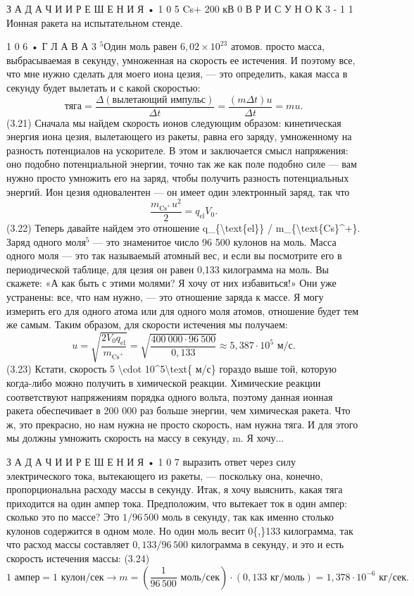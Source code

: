 \documentclass[10pt,oneside]{article}
\begin{document}
З А Д А Ч И  И  Р Е Ш Е Н И Я • 1 0 5 Cs+ 200 кВ 0 В Р И С У Н О К  3 - 1 1 Ионная ракета на испытательном стенде.\par

1 0 6 • Г Л А В А  3 \(^5\)Один моль равен \(6{,}02 \times 10^{23}\) атомов. просто масса, выбрасываемая в секунду, умноженная на скорость ее истечения. И поэтому все, что мне нужно сделать для моего иона цезия, --- это определить, какая масса в секунду будет вылетать и с какой скоростью: \[\text{тяга} = \frac{\Delta(\text{вылетающий импульс})}{\Delta t} = \frac{(m\Delta t) u}{\Delta t} = mu.\] (3.21) Сначала мы найдем скорость ионов следующим образом: кинетическая энергия иона цезия, вылетающего из ракеты, равна его заряду, умноженному на разность потенциалов на ускорителе. В этом и заключается смысл напряжения: оно подобно потенциальной энергии, точно так же как поле подобно силе --- вам нужно просто умножить его на заряд, чтобы получить разность потенциальных энергий. Ион цезия одновалентен --- он имеет один электронный заряд, так что \[\frac{m_{\text{Cs}^+} u^2}{2} = q_{\text{el}} V_0.\] (3.22) Теперь давайте найдем это отношение q\_\{\textbackslash{}text\{el\}\} / m\_\{\textbackslash{}text\{Cs\}\textasciicircum{}+\}. Заряд одного моля\(^5\) --- это знаменитое число 96 500 кулонов на моль. Масса одного моля --- это так называемый атомный вес, и если вы посмотрите его в периодической таблице, для цезия он равен 0,133 килограмма на моль. Вы скажете: «А как быть с этими молями? Я хочу от них избавиться!» Они уже устранены: все, что нам нужно, --- это отношение заряда к массе. Я могу измерить его для одного атома или для одного моля атомов, отношение будет тем же самым. Таким образом, для скорости истечения мы получаем: \[u = \sqrt{\frac{2 V_0 q_{\text{el}}}{m_{\text{Cs}^+}}} = \sqrt{\frac{400\ 000 \cdot 96\ 500}{0{,}133}} \approx 5{,}387 \cdot 10^5\text{ м/с}.\] (3.23) Кстати, скорость 5 \textbackslash{}cdot 10\textasciicircum{}5\textbackslash{}text\{ м/с\} гораздо выше той, которую когда-либо можно получить в химической реакции. Химические реакции соответствуют напряжениям порядка одного вольта, поэтому данная ионная ракета обеспечивает в 200 000 раз больше энергии, чем химическая ракета. Что ж, это прекрасно, но нам нужна не просто скорость, нам нужна тяга. И для этого мы должны умножить скорость на массу в секунду, m. Я хочу...\par

З А Д А Ч И  И  Р Е Ш Е Н И Я • 1 0 7 выразить ответ через силу электрического тока, вытекающего из ракеты, --- поскольку она, конечно, пропорциональна расходу массы в секунду. Итак, я хочу выяснить, какая тяга приходится на один ампер тока. Предположим, что вытекает ток в один ампер: сколько это по массе? Это \(1/96\,500\) моль в секунду, так как именно столько кулонов содержится в одном моле. Но один моль весит 0\{,\}133 килограмма, так что расход массы составляет \(0{,}133/96\,500\) килограмма в секунду, и это и есть скорость истечения массы: (3.24) \[1\text{ ампер} = 1\text{ кулон/сек} \rightarrow m = \left(\frac{1}{96\,500}\text{ моль/сек}\right) \cdot (0{,}133\text{ кг/моль}) = 1{,}378 \cdot 10^{-6}\text{ кг/сек}.\]\par
\end{document}
